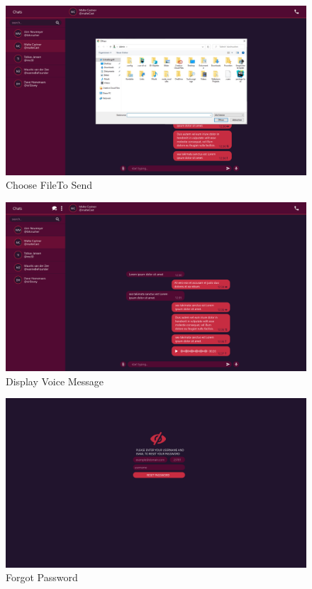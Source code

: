 \begin{figure}[h]
    \centering
    \includegraphics[width=1.0\textwidth]{./graphics/wireframes/ChooseFiletoSend}
    \caption{Choose FileTo Send}
    \label{fig:figure15}
\end{figure}

\begin{figure}[h]
    \centering
    \includegraphics[width=1.0\textwidth]{./graphics/wireframes/DisplayVoiceMessage}
    \caption{Display Voice Message}
    \label{fig:figure16}
\end{figure}

\begin{figure}[h]
    \centering
    \includegraphics[width=1.0\textwidth]{./graphics/wireframes/ForgotPassword}
    \caption{Forgot Password}
    \label{fig:figure17}
\end{figure}

